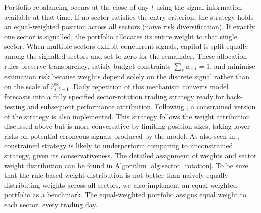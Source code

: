 Portfolio rebalancing occurs at the close of day $t$ using the signal information available at that time.  If no sector satisfies the entry criterion, the strategy holds an equal-weighted position across all sectors (naive risk diversification).  If exactly one sector is signalled, the portfolio allocates its entire weight to that single sector.  When multiple sectors exhibit concurrent signals, capital is split equally among the signalled sectors and set to zero for the remainder. These allocation rules preserve transparency, satisfy budget constraints $\sum_{s}w_{s,t}=1$, and minimise estimation risk because weights depend solely on the discrete signal rather than on the scale of $\widehat{r}^{\text{ex}}_{s,t+1}$.  Daily repetition of this mechanism converts model forecasts into a fully specified sector-rotation trading strategy ready for back-testing and subsequent performance attribution. Following , a constrained version of the strategy is also implemented. This strategy follows the weight attribution discussed above but is more conversative by limiting position sizes, taking lower risks on potential erroneous signals produced by the model. As also seen in , constrained strategy is likely to underperform comparing to unconstrained strategy, given its conservativeness. The detailed assignment of weights and sector weight distribution can be found in Algorithm \ref{alg:sector_rotation}. To be sure that the rule-based weight distribution is not better than naively equally distributing weights across all sectors, we also implement an equal-weighted portfolio as a benchmark. The equal-weighted portfolio assigns equal weight to each sector, every trading day. 

